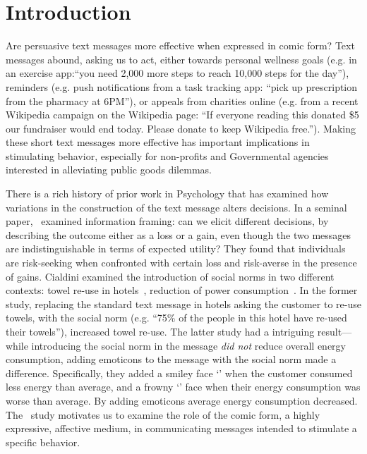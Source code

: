 
\section{Introduction}
\label{sec:Introduction}
Are persuasive text messages more effective when expressed in comic form? Text messages abound, asking us to act, either towards personal wellness goals (e.g. in an exercise app:``you need 2,000 more steps to reach 10,000 steps for the day''), reminders (e.g. push notifications from a task tracking app: ``pick up prescription from the pharmacy at 6PM''), or appeals from charities online (e.g. from a recent Wikipedia campaign on the Wikipedia page: ``If everyone reading this donated \$5 our fundraiser would end today. Please donate to keep Wikipedia free.''). Making these short text messages more effective has important implications in stimulating behavior, especially for non-profits and Governmental agencies interested in alleviating public goods dilemmas.

There is a rich history of prior work in Psychology that has examined how variations in the construction of the text message alters decisions. In a seminal paper,~\textcite{tversky1981framing} examined information framing: can we elicit different decisions, by describing the outcome either as a loss or a gain, even though the two messages are indistinguishable in terms of expected utility? They found that individuals are risk-seeking when confronted with certain loss and risk-averse in the presence of gains. Cialdini examined the introduction of social norms in two different contexts: towel re-use in hotels~\parencite{goldstein2008room}, reduction of power consumption~\parencite{schultz2007constructive}. In the former study, replacing the standard text message in hotels asking the customer to re-use towels, with the social norm (e.g. ``75\% of the people in this hotel have re-used their towels''), increased towel re-use. The latter study had a intriguing result---while introducing the social norm in the message \textit{did not} reduce overall energy consumption, adding emoticons to the message with the social norm made a difference. Specifically, they added a smiley face `\smiley{}' when the customer consumed less energy than average, and a frowny `\frownie{}' face when their energy consumption was worse than average. By adding emoticons average energy consumption decreased. The~\textcite{schultz2007constructive} study motivates us to examine the role of the comic form, a highly expressive, affective medium, in communicating messages intended to stimulate a specific behavior.

